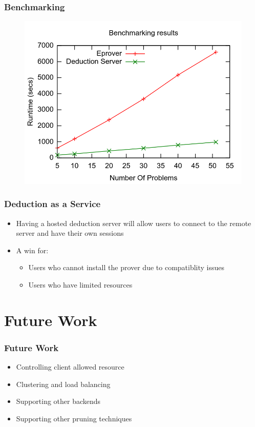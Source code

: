 \documentclass[10pt]{beamer}
\begin{document}
\begin{frame}[fragile]
  \frametitle{Benchmarking}
\begin{figure} \includegraphics[width=\linewidth,height=0.9\textheight,keepaspectratio]{imgs/BenchmarkingResults.png} \end{figure}
\end{frame}

\begin{frame}[fragile]
  \frametitle{Deduction as a Service}
  \begin{itemize}[<+- | alert@+>]
    \item Having a hosted deduction server will allow users to connect to the remote server and have their own sessions
    \item A win for:
      \begin{itemize}
          \item Users who cannot install the prover due to compatiblity issues
          \item Users who have limited resources
      \end{itemize}
  \end{itemize}

\end{frame}

\section{Future Work}
\begin{frame}[fragile]
  \frametitle{Future Work}
  \begin{itemize}[<+- | alert@+>]
    \item Controlling client allowed resource
    \item Clustering and load balancing
    \item Supporting other backends
    \item Supporting other pruning techniques
  \end{itemize}
\end{frame}
\end{document}

